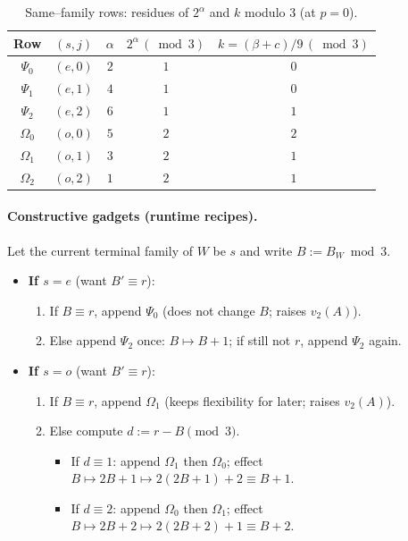 \documentclass[11pt,letterpaper]{amsart}
\def\mathrm#1{#1}%
\theoremstyle{definition}
\theoremstyle{plain}
\theoremstyle{plain}
\theoremstyle{remark}
\begin{document}
\begin{table}[h]
\centering
\caption{Same–family rows: residues of $2^{\alpha}$ and $k$ modulo $3$ (at $p{=}0$).}
\label{tab:mod3-ee-oo}
\begin{tabular}{@{}c c c c c@{}}
\toprule
Row & $(s,j)$ & $\alpha$ & $2^{\alpha}\,(\bmod 3)$ & $k=(\beta+c)/9\,(\bmod 3)$\\
\midrule
$\Psi_{0}$ & $(\mathrm e,0)$ & $2$ & $1$ & $0$ \\
$\Psi_{1}$ & $(\mathrm e,1)$ & $4$ & $1$ & $0$ \\
$\Psi_{2}$ & $(\mathrm e,2)$ & $6$ & $1$ & $1$ \\
\midrule
$\Omega_{0}$ & $(\mathrm o,0)$ & $5$ & $2$ & $2$ \\
$\Omega_{1}$ & $(\mathrm o,1)$ & $3$ & $2$ & $1$ \\
$\Omega_{2}$ & $(\mathrm o,2)$ & $1$ & $2$ & $1$ \\
\bottomrule
\end{tabular}
\end{table}

\paragraph{Constructive gadgets (runtime recipes).}
Let the current terminal family of $W$ be $s$ and write $B:=B_W\bmod 3$.

\begin{itemize}[leftmargin=1.6em]
\item \textbf{If $s=\mathrm e$} (want $B'\equiv r$):
  \begin{enumerate}[itemsep=2pt]
    \item If $B\equiv r$, append $\Psi_{0}$ (does not change $B$; raises $v_2(A)$).
    \item Else append $\Psi_{2}$ once: $B\mapsto B+1$; if still not $r$, append $\Psi_{2}$ again.
  \end{enumerate}
\item \textbf{If $s=\mathrm o$} (want $B'\equiv r$):
  \begin{enumerate}[itemsep=2pt]
    \item If $B\equiv r$, append $\Omega_{1}$ (keeps flexibility for later; raises $v_2(A)$).
    \item Else compute $d:=r-B\pmod 3$.
      \begin{itemize}
        \item If $d\equiv 1$: append $\Omega_{1}$ then $\Omega_{0}$; effect $B\mapsto 2B+1\mapsto 2(2B+1)+2\equiv B+1$.
        \item If $d\equiv 2$: append $\Omega_{0}$ then $\Omega_{1}$; effect $B\mapsto 2B+2\mapsto 2(2B+2)+1\equiv B+2$.
      \end{itemize}
  \end{enumerate}
\end{itemize}
\end{document}
